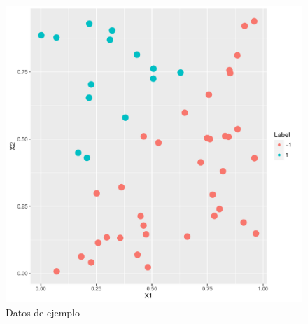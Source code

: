 \documentclass[a4paper,11pt]{book}\usepackage[]{graphicx}\usepackage[]{color}
\makeatletter
\def\maxwidth{ %
  \ifdim\Gin@nat@width>\linewidth
    \linewidth
  \else
    \Gin@nat@width
  \fi
}
\newenvironment{knitrout}{}{} %
\theoremstyle{plain}
\theoremstyle{definition}
\makeatother
\begin{document}
\begin{knitrout}
\color{fgcolor}\begin{figure}
\includegraphics[width=\maxwidth]{figure/dataExample-1} \caption[Datos de ejemplo]{Datos de ejemplo}\label{fig:dataExample}
\end{figure}


\end{knitrout}
\end{document}
